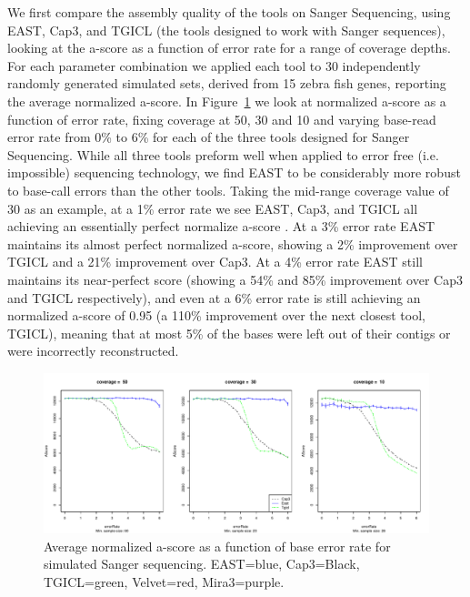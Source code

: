 \documentclass[10pt]{bmc_article}
\newcommand{\capthree} {{\small Cap3}}
\newcommand{\tgicl} {{\small TGICL}}
\newcommand{\east} {{\small EAST}}
\newcommand{\velvet}{{\small Velvet}}
\newcommand{\mira}{{\small Mira3}}
\newenvironment{bmcformat}{\begin{raggedright}\baselineskip20pt\sloppy\setboolean{publ}{false}}{\end{raggedright}\baselineskip20pt\sloppy}
\begin{document}
\begin{bmcformat}
 We first compare the assembly
quality of the tools on Sanger Sequencing, using \east, \capthree, and
\tgicl\/ (the tools designed to work with Sanger sequences), looking
at the a-score as a function of error rate for a range of coverage
depths.  For each parameter combination we applied each tool to 30
independently randomly generated simulated sets, derived from 15 zebra
fish genes, reporting the average normalized a-score.  In
Figure~\ref{sangerAscore} we look at normalized a-score as a function
of error rate, fixing coverage at 50, 30 and 10 and varying base-read
error rate from 0\% to 6\% for each of the three tools designed for
Sanger Sequencing.  While all three tools preform well when applied to
error free (i.e. impossible) sequencing technology, we find \east\/ to
be considerably more robust to base-call errors than the other tools.
Taking the mid-range coverage value of 30 as an example, at a 1\%
error rate we see \east, \capthree, and \tgicl\/ all achieving an
essentially perfect normalize a-score .  At a 3\% error rate \east\/
maintains its almost perfect normalized a-score, showing a 2\%
improvement over \tgicl\/ and a 21\% improvement over \capthree.  At a
4\% error rate \east\/ still maintains its near-perfect score (showing
a 54\% and 85\% improvement over \capthree\/ and \tgicl\/
respectively), and even at a 6\% error rate is still achieving an
normalized a-score of 0.95 (a 110\% improvement over the next closest
tool, \tgicl\/), meaning that at most 5\% of the bases were left out of
their contigs or were incorrectly reconstructed.


\begin{figure}[htb]
\centerline{\includegraphics[width=6in]{pics.d/ascore_sanger.pdf}}
\caption{Average normalized a-score as a function of base error rate for
  simulated Sanger sequencing.  \east=blue, \capthree=Black,
  \tgicl=green, \velvet=red, \mira=purple.}
\label{sangerAscore}
\end{figure}


\end{bmcformat}
\end{document}
